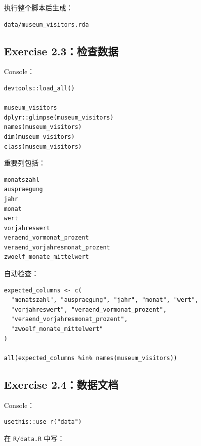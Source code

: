 \documentclass[11pt,a4paper]{ctexart}
\begin{document}
执行整个脚本后生成：

\begin{verbatim}
data/museum_visitors.rda
\end{verbatim}

\subsection{Exercise 2.3：检查数据}

Console：

\begin{lstlisting}
devtools::load_all()

museum_visitors
dplyr::glimpse(museum_visitors)
names(museum_visitors)
dim(museum_visitors)
class(museum_visitors)
\end{lstlisting}

重要列包括：

\begin{verbatim}
monatszahl
auspraegung
jahr
monat
wert
vorjahreswert
veraend_vormonat_prozent
veraend_vorjahresmonat_prozent
zwoelf_monate_mittelwert
\end{verbatim}

自动检查：

\begin{lstlisting}
expected_columns <- c(
  "monatszahl", "auspraegung", "jahr", "monat", "wert",
  "vorjahreswert", "veraend_vormonat_prozent",
  "veraend_vorjahresmonat_prozent",
  "zwoelf_monate_mittelwert"
)

all(expected_columns %in% names(museum_visitors))
\end{lstlisting}

\subsection{Exercise 2.4：数据文档}

Console：

\begin{lstlisting}
usethis::use_r("data")
\end{lstlisting}

在 \texttt{R/data.R} 中写：
\end{document}
